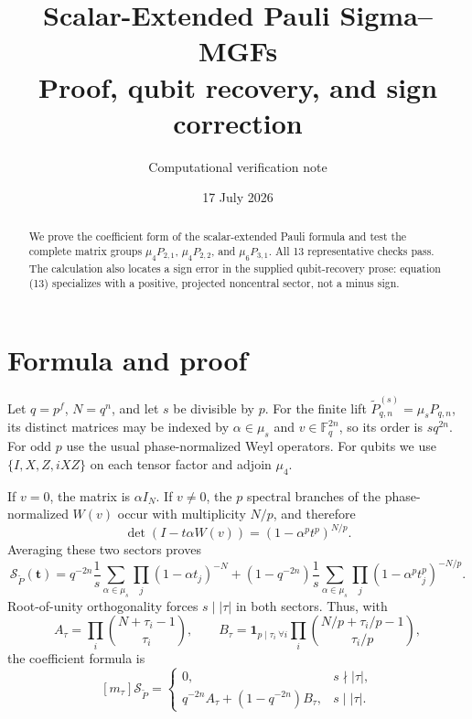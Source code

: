 \documentclass[11pt]{article}
\title{\color{navy}\bfseries Scalar-Extended Pauli Sigma--MGFs\\\large Proof, qubit recovery, and sign correction}
\author{Computational verification note}\date{17 July 2026}
\newcommand{\Sgm}{\mathcal S}
\begin{document}
\maketitle
\begin{abstract}
We prove the coefficient form of the scalar-extended Pauli formula and test
the complete matrix groups $\mu_4P_{2,1}$, $\mu_4P_{2,2}$, and
$\mu_6P_{3,1}$.  All 13 representative checks pass.  The calculation also
locates a sign error in the supplied qubit-recovery prose: equation (13)
specializes with a positive, projected noncentral sector, not a minus sign.
\end{abstract}

\section{Formula and proof}
Let $q=p^f$, $N=q^n$, and let $s$ be divisible by $p$.  For the finite lift
$\widetilde P_{q,n}^{(s)}=\mu_sP_{q,n}$, its distinct matrices may be indexed
by $\alpha\in\mu_s$ and $v\in\mathbb F_q^{2n}$, so its order is $sq^{2n}$.
For odd $p$ use the usual phase-normalized Weyl operators.  For qubits we use
$\{I,X,Z,iXZ\}$ on each tensor factor and adjoin $\mu_4$.

If $v=0$, the matrix is $\alpha I_N$.  If $v\ne0$, the $p$ spectral branches
of the phase-normalized $W(v)$ occur with multiplicity $N/p$, and therefore
\[
\det(I-t\alpha W(v))=(1-\alpha^p t^p)^{N/p}.
\]
Averaging these two sectors proves
\begin{equation}\label{eq:scalar}
\Sgm_{\widetilde P}(\mathbf t)=
q^{-2n}\frac1s\sum_{\alpha\in\mu_s}\prod_j(1-\alpha t_j)^{-N}
+(1-q^{-2n})\frac1s\sum_{\alpha\in\mu_s}
\prod_j(1-\alpha^pt_j^p)^{-N/p}.
\end{equation}
Root-of-unity orthogonality forces $s\mid|\tau|$ in both sectors.  Thus,
with
\[
A_\tau=\prod_i\binom{N+\tau_i-1}{\tau_i},\qquad
B_\tau=\mathbf1_{p\mid\tau_i\ \forall i}
\prod_i\binom{N/p+\tau_i/p-1}{\tau_i/p},
\]
the coefficient formula is
\begin{equation}\label{eq:coeff}
[m_\tau]\Sgm_{\widetilde P}=\begin{cases}
0,&s\nmid|\tau|,\\
q^{-2n}A_\tau+(1-q^{-2n})B_\tau,&s\mid|\tau|.
\end{cases}
\end{equation}
\end{document}
